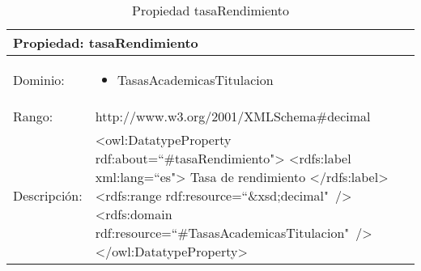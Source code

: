 \begin{table}[!ht]
	\centering
	\begin{tabular}{|p{}|p{}|}
		\hline
		\multicolumn{2}{|l|}{Propiedad: \textbf{tasaRendimiento}}
		\\ \hline
		Dominio:&
		\begin{itemize}
			\item TasasAcademicasTitulacion
		\end{itemize}
		\\ \hline
		Rango:&
		http://www.w3.org/2001/XMLSchema\#decimal
		\\ \hline
		Descripción:&
		\textless owl:DatatypeProperty rdf:about=``\#tasaRendimiento"\textgreater\newline 
		\tab\textless rdfs:label xml:lang=``es"\textgreater\newline
		\tab\tab Tasa de rendimiento\newline
		\tab\textless /rdfs:label\textgreater\newline
		\tab\textless rdfs:range\newline
		\tab\tab rdf:resource=``\&xsd;decimal"\ /\textgreater\newline
		\tab\textless rdfs:domain\newline
		\tab\tab rdf:resource=``\#TasasAcademicasTitulacion"\ /\textgreater\newline
		\textless /owl:DatatypeProperty\textgreater
		\\ \hline
	\end{tabular}
	\caption{Propiedad tasaRendimiento}
	\label{propiedad-tasarendimiento}
\end{table}

